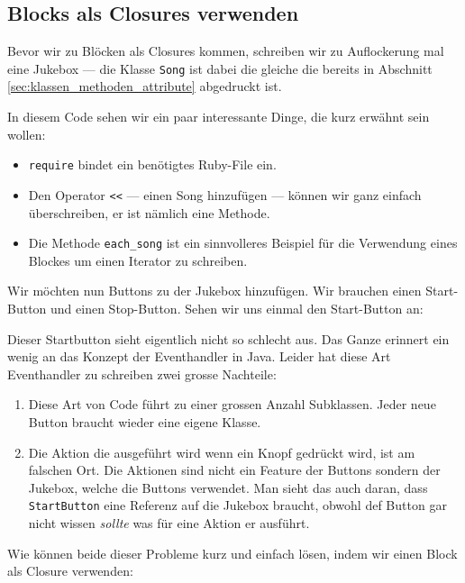 \documentclass[a4book,11pt,twoside]{scrbook}
\begin{document}
\subsection*{Blocks als Closures verwenden} %
\label{sub:blocks_als_closures_verwenden}
Bevor wir zu Blöcken als Closures kommen, schreiben wir  zu Auflockerung mal eine Jukebox — die Klasse \texttt{Song} ist dabei die gleiche die bereits in Abschnitt \ref{sec:klassen_methoden_attribute} abgedruckt ist.



In diesem Code sehen wir ein paar interessante Dinge, die kurz erwähnt sein wollen:

\begin{itemize}
	\item \texttt{require} bindet ein benötigtes Ruby-File ein.
	\item Den Operator \texttt{<<} — einen Song hinzufügen — können wir ganz einfach überschreiben, er ist nämlich eine Methode.
	\item Die Methode \texttt{each\_song} ist ein sinnvolleres Beispiel für die Verwendung eines Blockes um einen Iterator zu schreiben.
\end{itemize}

Wir möchten nun Buttons zu der Jukebox hinzufügen. Wir brauchen einen Start-Button und einen Stop-Button. Sehen wir uns einmal den Start-Button an:





Dieser Startbutton sieht eigentlich nicht so schlecht aus. Das Ganze erinnert ein wenig an das Konzept der Eventhandler in Java. Leider hat diese Art Eventhandler zu schreiben zwei grosse Nachteile:
\begin{enumerate}
	\item Diese Art von Code führt zu einer grossen Anzahl Subklassen. Jeder neue Button braucht wieder eine eigene Klasse.
	\item Die Aktion die ausgeführt wird wenn ein Knopf gedrückt wird, ist am falschen Ort. Die Aktionen sind nicht ein Feature der Buttons sondern der Jukebox, welche die Buttons verwendet. Man sieht das auch daran, dass \texttt{StartButton} eine Referenz auf die Jukebox braucht, obwohl def Button gar nicht wissen \emph{sollte} was für eine Aktion er ausführt.
\end{enumerate}

Wie können beide dieser Probleme kurz und einfach lösen, indem wir einen Block als Closure verwenden:
\end{document}
